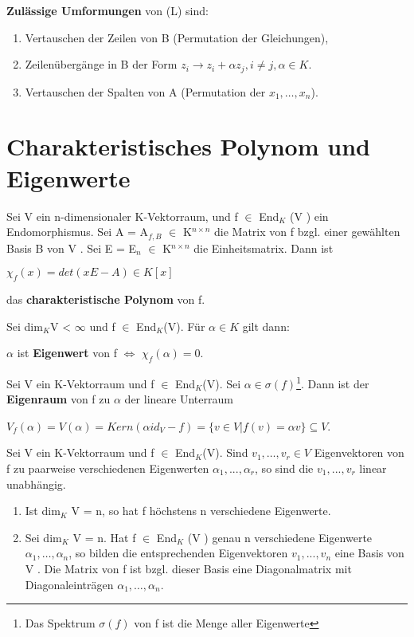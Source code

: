 \textbf{Zulässige Umformungen} von (L) sind:
\begin{enumerate}
\item Vertauschen der Zeilen von B (Permutation der Gleichungen),
\item Zeilenübergänge in B der Form $z_i \to z_i+\alpha z_j, i \neq j,\alpha \in K$.
\item Vertauschen der Spalten von A (Permutation der $x_1, …, x_n$).
\end{enumerate}


\section{Charakteristisches Polynom und Eigenwerte}
\begin{definition}
Sei V ein n-dimensionaler K-Vektorraum, und f $\in$ End$_K$ (V ) ein Endomorphismus. Sei A = A$_{f,B}$ $\in$ K$^{n \times n}$ die Matrix von f bzgl. einer gewählten Basis B von V . Sei E = E$_n$ $\in$ K$^{n \times n}$ die Einheitsmatrix. Dann ist
\begin{center}
$\chi_f (x) = det(xE - A) \in K[x]$
\end{center}
das \textbf{charakteristische Polynom} von f.
\end{definition}

\begin{lemma}
Sei dim$_K$V < $\infty$ und f $\in$ End$_K$(V). Für $\alpha \in K$ gilt dann:
\begin{center}
$\alpha$ ist \textbf{Eigenwert} von f $\Leftrightarrow$ $\chi_f(\alpha) = 0$.
\end{center}
\end{lemma}

\begin{definition}
Sei V ein K-Vektorraum und f $\in$ End$_K$(V).
Sei $\alpha \in \sigma(f)$\footnote{Das Spektrum $\sigma(f)$ von f ist die Menge aller Eigenwerte}. Dann ist der \textbf{Eigenraum} von f zu $\alpha$ der lineare Unterraum
\begin{center}
$V_f(\alpha) = V(\alpha) = Kern(\alpha id_V - f) = \{v \in V | f(v) = \alpha v\} \subseteq V$.
\end{center}
\end{definition}

\begin{lemma}
Sei V ein K-Vektorraum und f $\in$ End$_K$(V). Sind $v_1, …, v_r \in V$ Eigenvektoren von f zu paarweise verschiedenen Eigenwerten $\alpha_1, ..., \alpha_r$, so sind die $v_1, ..., v_r$ linear unabhängig.
\begin{enumerate}
\item Ist dim$_K$ V = n, so hat f höchstens n verschiedene Eigenwerte.
\item Sei dim$_K$ V = n. Hat f $\in$ End$_K$ (V ) genau n verschiedene Eigenwerte $\alpha_1, …, \alpha_n$, so bilden die entsprechenden Eigenvektoren $v_1, ..., v_n$ eine Basis von V . Die Matrix von f ist bzgl. dieser Basis eine Diagonalmatrix mit Diagonaleinträgen $\alpha_1, …, \alpha_n$.
\end{enumerate}
\end{lemma}


